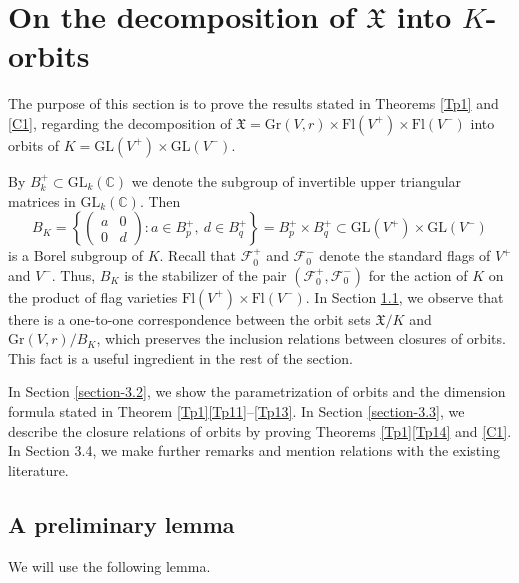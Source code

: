 \documentclass[11pt]{article}
\theoremstyle{definition}
\numberwithin{equation}{section}
\newcommand{\flag}{\mathcal{F}}
\newcommand{\Xfv}{\mathfrak{X}}
\newcommand{\Grass}{\mathrm{Gr}}
\newcommand{\Flags}{\mathrm{Fl}}
\newcommand{\GL}{\mathrm{GL}}
\newcommand{\mC}{\mathbb{C}}
\begin{document}
\section{On the decomposition of $\Xfv$ into $K$-orbits}

\label{section-3}

The purpose of this section is to prove the results stated in Theorems \ref{Tp1} and \ref{C1}, regarding the decomposition of $\Xfv=\Grass(V,r)\times\Flags(V^+)\times\Flags(V^-)$ into orbits of $K=\GL(V^+)\times\GL(V^-)$.

By $B_k^+\subset\GL_k(\mC)$ we denote the subgroup of invertible upper triangular matrices in $\GL_k(\mC)$.
Then\[B_K=\left\{\begin{pmatrix}
a & 0\\ 0 & d
\end{pmatrix}:a\in B_p^+,\ d\in B_q^+\right\}=B_p^+\times B_q^+\subset\GL(V^+)\times\GL(V^-)\]
is a Borel subgroup of $K$. Recall that $\flag_0^+$ and $\flag_0^-$ denote the standard flags of $V^+$ and $V^-$. Thus, $B_K$ is the stabilizer of the pair $(\flag_0^+,\flag_0^-)$ for the action of $K$ on the product of flag varieties $\Flags(V^+)\times\Flags(V^-)$.
In Section \ref{section-3.1}, we observe that there is a one-to-one correspondence between the orbit sets $\Xfv/K$ and $\Grass(V,r)/B_K$, which preserves the inclusion relations between closures of orbits. This fact is a useful ingredient in the rest of the section.

In Section \ref{section-3.2}, we show the parametrization of orbits and the dimension formula stated in Theorem \ref{Tp1}\ref{Tp11}--\ref{Tp13}. In Section \ref{section-3.3}, we describe the closure relations of orbits
by proving Theorems \ref{Tp1}\ref{Tp14} and \ref{C1}.
In Section 3.4, we make further remarks and mention relations with the existing literature.


\subsection{A preliminary lemma}

\label{section-3.1}

We will use the following lemma.
\end{document}

